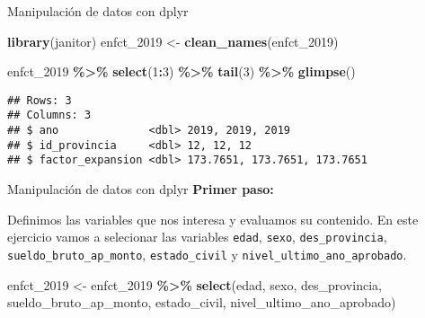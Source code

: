 \documentclass[
  ignorenonframetext,
]{beamer}
\newenvironment{Shaded}{\begin{snugshade}}{\end{snugshade}}
\newcommand{\DecValTok}[1]{\textcolor[rgb]{0.00,0.00,0.81}{#1}}
\newcommand{\FunctionTok}[1]{\textcolor[rgb]{0.13,0.29,0.53}{\textbf{#1}}}
\newcommand{\NormalTok}[1]{#1}
\newcommand{\OtherTok}[1]{\textcolor[rgb]{0.56,0.35,0.01}{#1}}
\newcommand{\SpecialCharTok}[1]{\textcolor[rgb]{0.81,0.36,0.00}{\textbf{#1}}}
\begin{document}
\begin{frame}[fragile]{Manipulación de datos con dplyr}
\label{manipulaciuxf3n-de-datos-con-dplyr-2}
\begin{Shaded}
\begin{Highlighting}[]
\FunctionTok{library}\NormalTok{(janitor)}
\NormalTok{enfct\_2019 }\OtherTok{\textless{}{-}} \FunctionTok{clean\_names}\NormalTok{(enfct\_2019)}
\end{Highlighting}
\end{Shaded}

\begin{Shaded}
\begin{Highlighting}[]
\NormalTok{enfct\_2019  }\SpecialCharTok{\%\textgreater{}\%} 
  \FunctionTok{select}\NormalTok{(}\DecValTok{1}\SpecialCharTok{:}\DecValTok{3}\NormalTok{) }\SpecialCharTok{\%\textgreater{}\%} 
  \FunctionTok{tail}\NormalTok{(}\DecValTok{3}\NormalTok{) }\SpecialCharTok{\%\textgreater{}\%} 
  \FunctionTok{glimpse}\NormalTok{()}
\end{Highlighting}
\end{Shaded}

\begin{verbatim}
## Rows: 3
## Columns: 3
## $ ano              <dbl> 2019, 2019, 2019
## $ id_provincia     <dbl> 12, 12, 12
## $ factor_expansion <dbl> 173.7651, 173.7651, 173.7651
\end{verbatim}
\end{frame}

\begin{frame}[fragile]{Manipulación de datos con dplyr}
\label{manipulaciuxf3n-de-datos-con-dplyr-3}
\textbf{Primer paso:}

Definimos las variables que nos interesa y evaluamos su contenido. En
este ejercicio vamos a selecionar las variables \texttt{edad},
\texttt{sexo}, \texttt{des\_provincia},
\texttt{sueldo\_bruto\_ap\_monto}, \texttt{estado\_civil} y
\texttt{nivel\_ultimo\_ano\_aprobado}.

\begin{Shaded}
\begin{Highlighting}[]
\NormalTok{enfct\_2019 }\OtherTok{\textless{}{-}}\NormalTok{ enfct\_2019 }\SpecialCharTok{\%\textgreater{}\%} 
  \FunctionTok{select}\NormalTok{(edad, sexo, des\_provincia, }
\NormalTok{         sueldo\_bruto\_ap\_monto, estado\_civil, }
\NormalTok{         nivel\_ultimo\_ano\_aprobado)}
\end{Highlighting}
\end{Shaded}
\end{frame}
\end{document}
